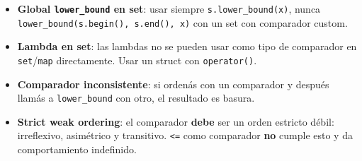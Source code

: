 \begin{itemize}
    \item \textbf{Global \texttt{lower\_bound} en set}: usar siempre \texttt{s.lower\_bound(x)}, nunca \texttt{lower\_bound(s.begin(), s.end(), x)} con un set con comparador custom.
    \item \textbf{Lambda en set}: las lambdas no se pueden usar como tipo de comparador en \texttt{set}/\texttt{map} directamente. Usar un struct con \texttt{operator()}.
    \item \textbf{Comparador inconsistente}: si ordenás con un comparador y después llamás a \texttt{lower\_bound} con otro, el resultado es basura.
    \item \textbf{Strict weak ordering}: el comparador \textbf{debe} ser un orden estricto débil: irreflexivo, asimétrico y transitivo. \texttt{<=} como comparador \textbf{no} cumple esto y da comportamiento indefinido.
\end{itemize}

